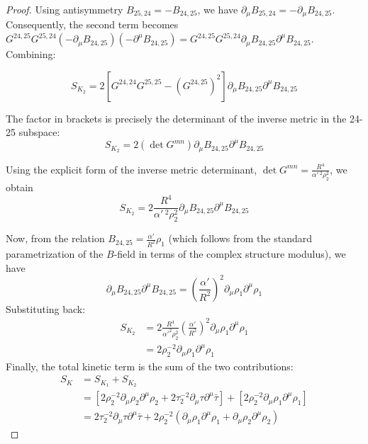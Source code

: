 \begin{tcolorbox}[breakable]
\begin{proof}
		Using antisymmetry \(B_{25,24} = -B_{24,25}\), we have \(\partial_\mu B_{25,24} = -\partial_\mu B_{24,25}\). Consequently, the second term becomes \(G^{24,25} G^{25,24} (-\partial_\mu B_{24,25})(-\partial^\mu B_{24,25}) = G^{24,25} G^{25,24} \partial_\mu B_{24,25} \partial^\mu B_{24,25}\). Combining:
		
		\begin{equation}
			S_{K_2} = 2 \left[ G^{24,24} G^{25,25} - (G^{24,25})^2 \right] \partial_\mu B_{24,25} \partial^\mu B_{24,25}
		\end{equation}
		
		The factor in brackets is precisely the determinant of the inverse metric in the 24-25 subspace:
		\begin{equation}
			S_{K_2} = 2 (\det G^{mn}) \partial_\mu B_{24,25} \partial^\mu B_{24,25}
		\end{equation}
		
		Using the explicit form of the inverse metric determinant, \(\det G^{mn} = \frac{R^4}{\alpha'\,^2 \rho_2^2}\), we obtain
		\begin{equation}
			S_{K_2} = 2 \frac{R^4}{\alpha'\,^2\rho_2^2} \partial_\mu B_{24,25} \partial^\mu B_{24,25}
		\end{equation}
		
		Now, from the relation \(B_{24,25} = \frac{\alpha'}{R^2} \rho_1\) (which follows from the standard parametrization of the \(B\)-field in terms of the complex structure modulus), we have
		\begin{equation}
			\partial_\mu B_{24,25} \partial^\mu B_{24,25} = \left( \frac{\alpha'}{R^2} \right)^2 \partial_\mu \rho_1 \partial^\mu \rho_1
		\end{equation}
		Substituting back:
		\begin{align}
			S_{K_2} &= 2 \frac{R^4}{\alpha'^2 \rho_2^2} \left( \frac{\alpha'}{R^2} \right)^2 \partial_\mu \rho_1 \partial^\mu \rho_1 \\
			&= 2 \rho_2^{-2} \partial_\mu \rho_1 \partial^\mu \rho_1
		\end{align}
		Finally, the total kinetic term is the sum of the two contributions:
		\begin{align}
			S_K &= S_{K_1} + S_{K_2} \\
			&= \left[ 2 \rho_2^{-2} \partial_\mu \rho_2 \partial^\mu \rho_2 + 2 \tau_2^{-2} \partial_\mu \tau \partial^\mu \bar{\tau} \right] 
			+ \left[ 2 \rho_2^{-2} \partial_\mu \rho_1 \partial^\mu \rho_1 \right] \\
			&= 2 \tau_2^{-2} \partial_\mu \tau \partial^\mu \bar{\tau} 
			+ 2 \rho_2^{-2} \left( \partial_\mu \rho_1 \partial^\mu \rho_1 + \partial_\mu \rho_2 \partial^\mu \rho_2 \right)
		\end{align}
		

\end{proof}
\end{tcolorbox}
